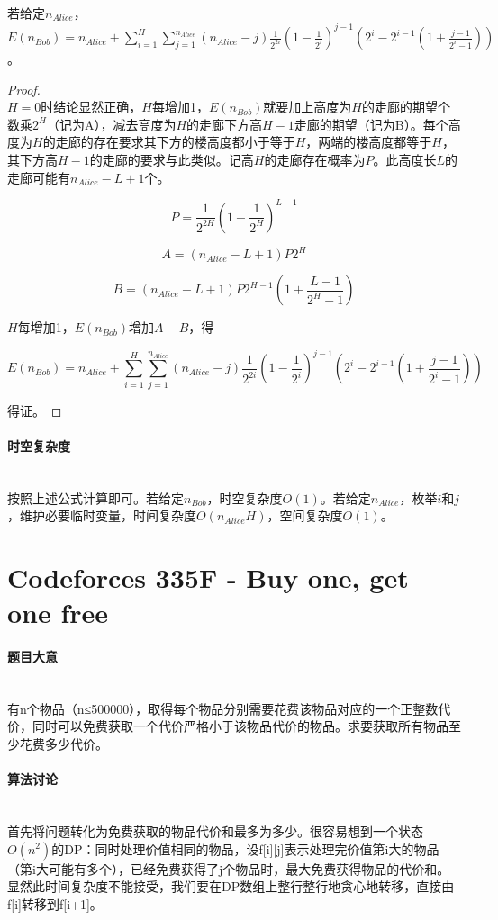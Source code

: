 \documentclass[UTF8]{ctexart}
\newcommand{\myparagraph}[1]{\paragraph{#1}\mbox{}\\}
\theoremstyle{nonumberplain}
\newtheorem{proof}{\hspace{1em}证明：}
\begin{document}
			若给定$n_{Alice}$，$E(n_{Bob})=n_{Alice}+\sum_{i=1}^{H}\sum_{j=1}^{n_{Alice}}(n_{Alice}-j)\frac{1}{2^{2i}}(1-\frac{1}{2^i})^{j-1}(2^i-2^{i-1}(1+\frac{j-1}{2^i-1}))$。
			
			\begin{proof}\mbox{}\\
			
				$H=0$时结论显然正确，$H$每增加1，$E(n_{Bob})$就要加上高度为$H$的走廊的期望个数乘$2^H$（记为A），减去高度为$H$的走廊下方高$H-1$走廊的期望（记为B）。每个高度为$H$的走廊的存在要求其下方的楼高度都小于等于$H$，两端的楼高度都等于$H$，其下方高$H-1$的走廊的要求与此类似。记高$H$的走廊存在概率为$P$。此高度长$L$的走廊可能有$n_{Alice}-L+1$个。
				
				$$P=\frac{1}{2^{2H}}(1-\frac{1}{2^H})^{L-1}$$
				
				$$A=(n_{Alice}-L+1)P2^H$$
				
				$$B=(n_{Alice}-L+1)P2^{H-1}(1+\frac{L-1}{2^H-1})$$
				
				$H$每增加1，$E(n_{Bob})$增加$A-B$，得
				
				$$E(n_{Bob})=n_{Alice}+\sum_{i=1}^{H}\sum_{j=1}^{n_{Alice}}(n_{Alice}-j)\frac{1}{2^{2i}}(1-\frac{1}{2^i})^{j-1}(2^i-2^{i-1}(1+\frac{j-1}{2^i-1}))$$
				
				得证。
			
			\end{proof}
			
		\myparagraph{时空复杂度}
		
			按照上述公式计算即可。若给定$n_{Bob}$，时空复杂度$O(1)$。若给定$n_{Alice}$，枚举$i$和$j$，维护必要临时变量，时间复杂度$O(n_{Alice}H)$，空间复杂度$O(1)$。
	
	\section{Codeforces 335F - Buy one, get one free}
	
		\myparagraph{题目大意}
			
			有n个物品（n≤500000），取得每个物品分别需要花费该物品对应的一个正整数代价，同时可以免费获取一个代价严格小于该物品代价的物品。求要获取所有物品至少花费多少代价。
			
		\myparagraph{算法讨论}
		
			首先将问题转化为免费获取的物品代价和最多为多少。很容易想到一个状态$O(n^2)$的DP：同时处理价值相同的物品，设f[i][j]表示处理完价值第i大的物品（第i大可能有多个），已经免费获得了j个物品时，最大免费获得物品的代价和。显然此时间复杂度不能接受，我们要在DP数组上整行整行地贪心地转移，直接由f[i]转移到f[i+1]。
			
\end{document}
